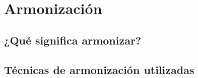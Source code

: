 \chapter{Armonización}
\label{cap:armonizacion}

\section{¿Qué significa armonizar?}

\section{Técnicas de armonización utilizadas}
